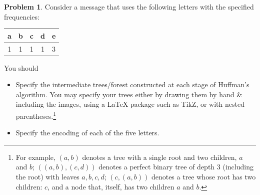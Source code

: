 \documentclass[11pt]{article}
\theoremstyle{definition}
\theoremstyle{definition}
\newtheorem{required}{Problem}
\theoremstyle{definition}
\newcommand{\standard}{9}
\begin{document}
\setcounter{required}{\standard-1}
\begin{required} 
Consider a message that uses the following letters with the specified frequencies:
\begin{center}
\begin{tabular}{|c|c|c|c|c|} \hline
a & b & c & d & e \\ \hline
1 & 1 & 1 & 1 & 3 \\ \hline
\end{tabular}
\end{center}
You should
\begin{itemize}
\item Specify the intermediate trees/forest constructed at each stage of Huffman's algorithm. You may specify your trees either by drawing them by hand \& including the images, using a LaTeX package such as TikZ, or with nested parentheses.\footnote{For example, $(a,b)$ denotes a tree with a single root and two children, $a$ and $b$; $((a,b), (c,d))$ denotes a perfect binary tree of depth 3 (including the root) with leaves $a,b,c,d$; $(c, (a,b))$ denotes a tree whose root has two children: $c$, and a node that, itself, has two children $a$ and $b$.}

\item Specify the encoding of each of the five letters.
\end{itemize}

\end{required}
\end{document}
